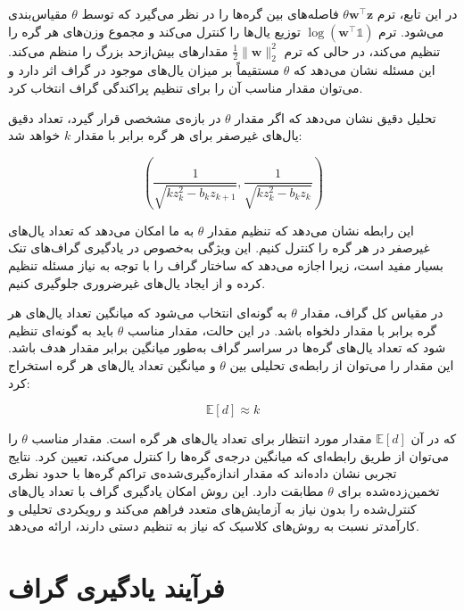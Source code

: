 \documentclass[10pt,twocolumn,a4paper]{article}
\begin{document}
      در این تابع، ترم \( \theta \bm{w}^\top \bm{z} \) فاصله‌های بین گره‌ها را در نظر می‌گیرد که توسط \( \theta \) مقیاس‌بندی می‌شود. ترم \( \log(\bm{w}^\top \mathds{1}) \) توزیع یال‌ها را کنترل می‌کند و مجموع وزن‌های هر گره را تنظیم می‌کند، در حالی که ترم \( \frac{1}{2} \|\bm{w}\|_2^2 \) مقدارهای بیش‌ازحد بزرگ را منظم می‌کند. این مسئله نشان می‌دهد که \( \theta \) مستقیماً بر میزان یال‌های موجود در گراف اثر دارد و می‌توان مقدار مناسب آن را برای تنظیم پراکندگی گراف انتخاب کرد.
      
      تحلیل دقیق نشان می‌دهد که اگر مقدار \( \theta \) در بازه‌ی مشخصی قرار گیرد، تعداد دقیق یال‌های غیرصفر برای هر گره برابر با مقدار \( k \) خواهد شد:
      
\begin{equation}
	      \left( \frac{1}{\sqrt{k z_k^2 - b_k z_{k+1}}}, \frac{1}{\sqrt{k z_k^2 - b_k z_k}} \right)
\end{equation}
      
      این رابطه نشان می‌دهد که تنظیم مقدار \( \theta \) به ما امکان می‌دهد که تعداد یال‌های غیرصفر در هر گره را کنترل کنیم. این ویژگی به‌خصوص در یادگیری گراف‌های تنک بسیار مفید است، زیرا اجازه می‌دهد که ساختار گراف را با توجه به نیاز مسئله تنظیم کرده و از ایجاد یال‌های غیرضروری جلوگیری کنیم.
      
      در مقیاس کل گراف، مقدار \( \theta \) به گونه‌ای انتخاب می‌شود که میانگین تعداد یال‌های هر گره برابر با مقدار دلخواه باشد. در این حالت، مقدار مناسب \( \theta \) باید به گونه‌ای تنظیم شود که تعداد یال‌های گره‌ها در سراسر گراف به‌طور میانگین برابر مقدار هدف باشد. این مقدار را می‌توان از رابطه‌ی تحلیلی بین \( \theta \) و میانگین تعداد یال‌های هر گره استخراج کرد:
      
      \[
      \mathbb{E}[d] \approx k
      \]
      
      که در آن \( \mathbb{E}[d] \) مقدار مورد انتظار برای تعداد یال‌های هر گره است. مقدار مناسب \( \theta \) را می‌توان از طریق رابطه‌ای که میانگین درجه‌ی گره‌ها را کنترل می‌کند، تعیین کرد. نتایج تجربی نشان داده‌اند که مقدار اندازه‌گیری‌شده‌ی تراکم گره‌ها با حدود نظری تخمین‌زده‌شده برای \( \theta \) مطابقت دارد. این روش امکان یادگیری گراف با تعداد یال‌های کنترل‌شده را بدون نیاز به آزمایش‌های متعدد فراهم می‌کند و رویکردی تحلیلی و کارآمدتر نسبت به روش‌های کلاسیک که نیاز به تنظیم دستی دارند، ارائه می‌دهد.
      
      
    
	\section{فرآیند یادگیری گراف}
	
\end{document}
